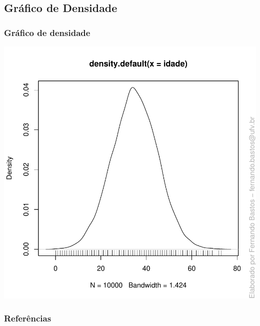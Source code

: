 \documentclass[14pt,aspectratio=1610]{beamer}
\begin{document}
\subsection{Gráfico de Densidade}
\begin{frame}{}
\frametitle{Gráfico de densidade}
\begin{block}{}
\begin{center}
\includegraphics{Aula5-idade2}
\end{center}
\end{block}
\end{frame}


\begin{frame}%
\frametitle{\bf Referências}
\printbibliography
\end{frame}
\end{document}

